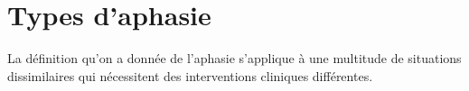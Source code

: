 \section{Types d'aphasie}

La définition qu'on a donnée de l'aphasie s'applique à une multitude de situations dissimilaires 
qui nécessitent des interventions cliniques différentes.